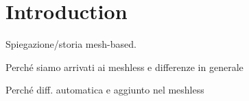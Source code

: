 \chapter{Introduction}
Spiegazione/storia mesh-based.

Perché siamo arrivati ai meshless e differenze in generale

Perché diff. automatica e aggiunto nel meshless
